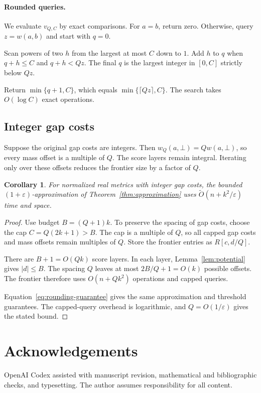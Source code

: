 \documentclass[11pt]{article}
\newtheorem{corollary}[theorem]{Corollary}
\theoremstyle{remark}
\newcommand{\gap}{\bot}
\newcommand{\eps}{\varepsilon}
\newcommand{\softO}{\widetilde O}
\begin{document}
\paragraph{Rounded queries.}\label{sec:rounded-queries}
We evaluate $v_{Q,C}$ by exact comparisons. For $a=b$, return zero.
Otherwise, query $z=w(a,b)$ and start with $q=0$.

Scan powers of two $h$ from the largest at most $C$ down to $1$.
Add $h$ to $q$ when $q+h\le C$ and $q+h<Qz$.
The final $q$ is the largest integer in $[0,C]$ strictly below $Qz$.

Return $\min\{q+1,C\}$, which equals $\min\{\lceil Qz\rceil,C\}$.
The search takes $O(\log C)$ exact operations.

\subsection{Integer gap costs}

Suppose the original gap costs are integers. Then
$w_Q(a,\gap)=Qw(a,\gap)$, so every mass offset is a multiple of $Q$.
The score layers remain integral. Iterating only over these offsets
reduces the frontier size by a factor of $Q$.

\begin{corollary}\label{cor:integer-gaps}
For normalized real metrics with integer gap costs, the bounded
$(1+\eps)$-approximation of Theorem~\ref{thm:approximation} uses
$\softO(n+k^2/\eps)$ time and space.
\end{corollary}
\begin{proof}
Use budget $B=(Q+1)k$.
To preserve the spacing of gap costs, choose the cap $C=Q(2k+1)>B$.
The cap is a multiple of $Q$, so all capped gap costs and mass offsets
remain multiples of $Q$.
Store the frontier entries as $R[c,d/Q]$.

There are $B+1=O(Qk)$ score layers.
In each layer, Lemma~\ref{lem:potential} gives $|d|\le B$.
The spacing $Q$ leaves at most $2B/Q+1=O(k)$ possible offsets.
The frontier therefore uses $O(n+Qk^2)$ operations and capped queries.

Equation~\eqref{eq:rounding-guarantee} gives the same approximation
and threshold guarantees. The capped-query overhead is logarithmic,
and $Q=O(1/\eps)$ gives the stated bound.
\end{proof}

\section*{Acknowledgements}
OpenAI Codex assisted with manuscript revision, mathematical and
bibliographic checks, and typesetting. The author assumes responsibility
for all content.

\begingroup
\raggedright


\endgroup
\end{document}
